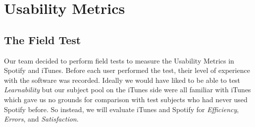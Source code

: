\documentclass[a4paper]{article}
\begin{document}
\section{Usability Metrics}
\label{sec:usabilityMetrics}

\subsection{The Field Test}
Our team decided to perform field tests to measure the Usability Metrics in Spotify and iTunes. Before each user performed the test, their level of experience with the software was recorded. Ideally we would have liked to be able to test \textit{Learnability} but our subject pool on the iTunes side were all familiar with iTunes which gave us no grounds for comparison with test subjects who had never used Spotify before. So instead, we will evaluate iTunes and Spotify for \textit{Efficiency}, \textit{Errors}, and \textit{Satisfaction}.
\end{document}
